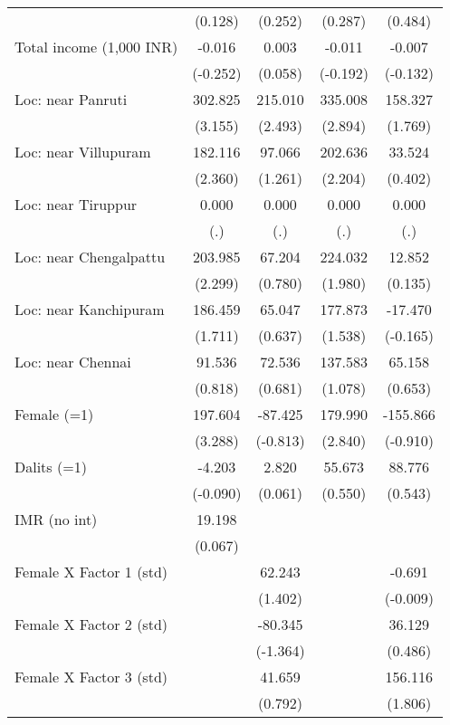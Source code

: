 \begin{table}[htbp]
{\begin{tabular}{lcccc}
          & (0.128) & (0.252) & (0.287) & (0.484) \\
    Total income (1,000 INR) & -0.016 & 0.003 & -0.011 & -0.007 \\
          & (-0.252) & (0.058) & (-0.192) & (-0.132) \\
    Loc: near Panruti & 302.825 & 215.010 & 335.008 & 158.327 \\
          & (3.155) & (2.493) & (2.894) & (1.769) \\
    Loc: near Villupuram & 182.116 & 97.066 & 202.636 & 33.524 \\
          & (2.360) & (1.261) & (2.204) & (0.402) \\
    Loc: near Tiruppur & 0.000 & 0.000 & 0.000 & 0.000 \\
          & (.)   & (.)   & (.)   & (.) \\
    Loc: near Chengalpattu & 203.985 & 67.204 & 224.032 & 12.852 \\
          & (2.299) & (0.780) & (1.980) & (0.135) \\
    Loc: near Kanchipuram & 186.459 & 65.047 & 177.873 & -17.470 \\
          & (1.711) & (0.637) & (1.538) & (-0.165) \\
    Loc: near Chennai & 91.536 & 72.536 & 137.583 & 65.158 \\
          & (0.818) & (0.681) & (1.078) & (0.653) \\
    Female (=1) & 197.604 & -87.425 & 179.990 & -155.866 \\
          & (3.288) & (-0.813) & (2.840) & (-0.910) \\
    Dalits (=1) & -4.203 & 2.820 & 55.673 & 88.776 \\
          & (-0.090) & (0.061) & (0.550) & (0.543) \\
    IMR (no int) & 19.198 &       &       &  \\
          & (0.067) &       &       &  \\
    Female X Factor 1 (std) &       & 62.243 &       & -0.691 \\
          &       & (1.402) &       & (-0.009) \\
    Female X Factor 2 (std) &       & -80.345 &       & 36.129 \\
          &       & (-1.364) &       & (0.486) \\
    Female X Factor 3 (std) &       & 41.659 &       & 156.116 \\
          &       & (0.792) &       & (1.806) \\

\end{tabular}}
\end{table}
